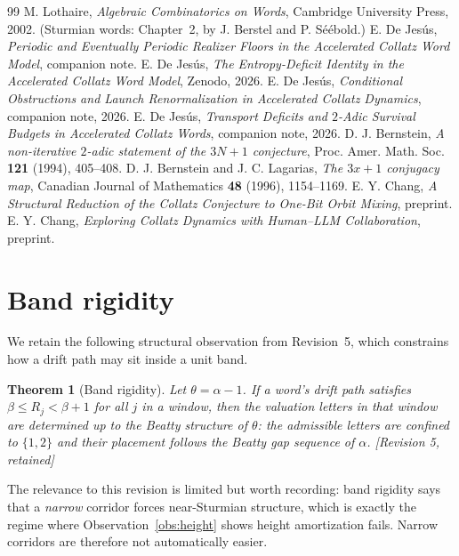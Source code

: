 \documentclass[11pt]{article}
\theoremstyle{plain}
\newtheorem{theorem}{Theorem}[section]
\theoremstyle{definition}
\theoremstyle{remark}
\newcommand{\al}{\alpha}
\newcommand{\status}[1]{\textsf{\footnotesize[#1]}}
\begin{document}
\begin{thebibliography}{99}
 M. Lothaire, \emph{Algebraic Combinatorics on Words}, Cambridge University
Press, 2002. (Sturmian words: Chapter~2, by J. Berstel and P. S\'e\'ebold.)
 E. De Jes\'us, \emph{Periodic and Eventually Periodic Realizer Floors in the
Accelerated Collatz Word Model}, companion note.
 E. De Jes\'us, \emph{The Entropy-Deficit Identity in the Accelerated Collatz
Word Model}, Zenodo, 2026.
 E. De Jes\'us, \emph{Conditional Obstructions and Launch Renormalization in
Accelerated Collatz Dynamics}, companion note, 2026.
 E. De Jes\'us, \emph{Transport Deficits and $2$-Adic Survival Budgets in
Accelerated Collatz Words}, companion note, 2026.
 D. J. Bernstein, \emph{A non-iterative $2$-adic statement of the $3N+1$
conjecture}, Proc. Amer. Math. Soc. \textbf{121} (1994), 405--408.
 D. J. Bernstein and J. C. Lagarias, \emph{The $3x+1$ conjugacy map},
Canadian Journal of Mathematics \textbf{48} (1996), 1154--1169.
 E. Y. Chang, \emph{A Structural Reduction of the Collatz Conjecture to One-Bit
Orbit Mixing}, preprint.
 E. Y. Chang, \emph{Exploring Collatz Dynamics with Human--LLM Collaboration},
preprint.
\end{thebibliography}

\appendix

\section{Band rigidity}\label{sec:band}

We retain the following structural observation from Revision~5, which constrains how a drift path
may sit inside a unit band.

\begin{theorem}[Band rigidity]\label{thm:band}
Let $\theta=\al-1$. If a word's drift path satisfies $\beta\le R_j<\beta+1$ for all $j$ in a window,
then the valuation letters in that window are determined up to the Beatty structure of $\theta$: the
admissible letters are confined to $\{1,2\}$ and their placement follows the Beatty gap sequence of
$\al$. \status{Revision 5, retained}
\end{theorem}

The relevance to this revision is limited but worth recording: band rigidity says that a
\emph{narrow} corridor forces near-Sturmian structure, which is exactly the regime where
Observation~\ref{obs:height} shows height amortization fails. Narrow corridors are therefore not
automatically easier.
\end{document}
